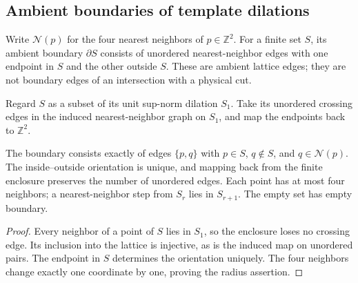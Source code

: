 \subsection{Ambient boundaries of template dilations}
\label{sec:area_law_template_boundary}

Write $\mathcal N(p)$ for the four nearest neighbors of $p\in\mathbb Z^2$.
For a finite set $S$, its ambient boundary $\partial S$ consists of unordered
nearest-neighbor edges with one endpoint in $S$ and the other outside $S$.
These are ambient lattice edges; they are not boundary edges of an intersection
with a physical cut.

\begin{definition}
    \label{def:area_law_ambient_boundary}
    \leanok
    Regard $S$ as a subset of its unit sup-norm dilation $S_1$.
    Take its unordered crossing edges in the induced nearest-neighbor graph
    on $S_1$, and map the endpoints back to $\mathbb Z^2$.
\end{definition}

\begin{lemma}
    \label{lem:area_law_ambient_boundary_crossing}
    \leanok
    The boundary consists exactly of edges $\{p,q\}$ with
    $p\in S$, $q\notin S$, and $q\in\mathcal N(p)$.
    The inside--outside orientation is unique, and mapping back from the
    finite enclosure preserves the number of unordered edges.
    Each point has at most four neighbors; a nearest-neighbor step from
    $S_r$ lies in $S_{r+1}$. The empty set has empty boundary.
\end{lemma}
\begin{proof}
    \leanok
    Every neighbor of a point of $S$ lies in $S_1$, so the enclosure loses
    no crossing edge. Its inclusion into the lattice is injective, as is
    the induced map on unordered pairs. The endpoint in $S$ determines the
    orientation uniquely. The four neighbors change exactly one coordinate
    by one, proving the radius assertion.
\end{proof}

